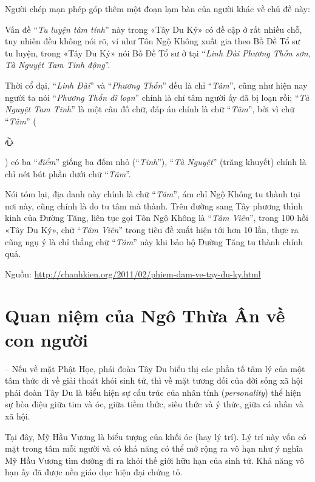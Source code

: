 \begin{small}
Người chép mạn phép góp thêm một đoạn lạm bàn của người khác về chủ đề này:

Vấn đề ``\emph{Tu luyện tâm tính}'' này trong «Tây Du Ký» có đề cập ở rất nhiều chỗ, tuy nhiên đều không nói rõ, ví như Tôn Ngộ Không xuất gia theo Bồ Đề Tổ sư tu luyện, trong «Tây Du Ký» nói Bồ Đề Tổ sư ở tại ``\emph{Linh Đài Phương Thốn sơn, Tà Nguyệt Tam Tinh động}''.

Thời cổ đại, ``\emph{Linh Đài}'' và ``\emph{Phương Thốn}'' đều là chỉ ``\emph{Tâm}'', cũng như hiện nay người ta nói ``\emph{Phương Thốn dĩ loạn}'' chính là chỉ tâm người ấy đã bị loạn rồi; ``\emph{Tà Nguyệt Tam Tinh}'' là một câu đố chữ, đáp án chính là chữ ``\emph{Tâm}'', bởi vì chữ ``\emph{Tâm}'' (\begin{CJK*}{UTF8}{bkai}心\end{CJK*}) có ba ``\emph{điểm}'' giống ba đốm nhỏ (``\emph{Tinh}''), ``\emph{Tà Nguyệt}'' (trăng khuyết) chính là chỉ nét bút phần dưới chữ ``\emph{Tâm}''.

Nói tóm lại, địa danh này chính là chữ ``\emph{Tâm}'', ám chỉ Ngộ Không tu thành tại nơi này, cũng chính là do tu tâm mà thành. Trên đường sang Tây phương thỉnh kinh của Đường Tăng, liên tục gọi Tôn Ngộ Không là ``\emph{Tâm Viên}'', trong 100 hồi «Tây Du Ký», chữ ``\emph{Tâm Viên}'' trong tiêu đề xuất hiện tới hơn 10 lần, thực ra cũng ngụ ý là chỉ thẳng chữ ``\emph{Tâm}'' này khi bảo hộ Đường Tăng tu thành chính quả.

Nguồn: \href{http://chanhkien.org/2011/02/phiem-dam-ve-tay-du-ky.html}{http://chanhkien.org/2011/02/phiem-dam-ve-tay-du-ky.html}
\end{small}

\hrulefill

\section{Quan niệm của Ngô Thừa Ân về con người} %
\label{sec:1_quan_niem_ve_con_nguoi}

-- Nếu về mặt Phật Học, phái đoàn Tây Du biểu thị các phần tố tâm lý của một tâm thức đi về giải thoát khỏi sinh tử, thì về mặt tương đối của đời sống xã hội phái đoàn Tây Du là biểu hiện sự cấu trúc của nhân tính (\emph{personality}) thể hiện sự hòa điệu giữa tim và óc, giữa tiềm thức, siêu thức và ý thức, giữa cá nhân và xã hội.

Tại đây, Mỹ Hầu Vương là biểu tượng của khối óc (hay lý trí). Lý trí này vốn có mặt trong tâm mỗi người và có khả năng có thể mở rộng ra vô hạn như ý nghĩa Mỹ Hầu Vương tìm đường đi ra khỏi thế giới hữu hạn của sinh tử. Khả năng vô hạn ấy đã được nền giáo dục hiện đại chứng tỏ.

